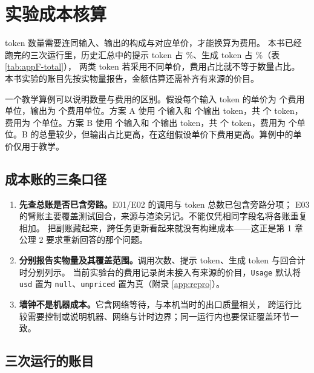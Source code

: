 \chapter{实验成本核算}
\label{app:cost}

\begin{failurebox}
token 数量需要连同输入、输出的构成与对应单价，才能换算为费用。
本书已经跑完的三次运行里，历史汇总中的提示 token 占 \%、生成 token 占 \%（表 \ref{tab:appF-total}），
两类 token 若采用不同单价，费用占比就不等于数量占比。
本书实验的账目先按实物量报告，金额估算还需补齐有来源的价目。
\end{failurebox}

一个教学算例可以说明数量与费用的区别。假设每个输入 token 的单价为  个费用单位，输出为  个费用单位。方案 A 使用  个输入和  个输出 token，共  个 token，费用为  个单位。方案 B 使用  个输入和  个输出 token，共  个 token，费用为  个单位。B 的总量较少，但输出占比更高，在这组假设单价下费用更高。算例中的单价仅用于教学。

\section{成本账的三条口径}

\begin{enumerate}
  \item \textbf{先查总账是否已含旁路。}E01/E02 的调用与 token 总数已包含旁路分项；
        E03 的臂账主要覆盖测试回合，来源与渲染另记。不能仅凭相同字段名将各账重复相加。
        把副账藏起来，跨任务更新看起来就没有构建成本——这正是第 1 章公理 2 要求重新回答的那个问题。
  \item \textbf{分别报告实物量及其覆盖范围。}调用次数、提示 token、生成 token 与回合计时分别列示。
        当前实验台的费用记录尚未接入有来源的价目，\texttt{Usage} 默认将 \texttt{usd} 置为 \texttt{null}、\texttt{unpriced} 置为真（附录 \ref{app:repro}）。
  \item \textbf{墙钟不是机器成本。}它含网络等待，与本机当时的出口质量相关，
        跨运行比较需要控制或说明机器、网络与计时边界；同一运行内也要保证覆盖环节一致。
\end{enumerate}

\section{三次运行的账目}
\label{sec:appF-ledger}

